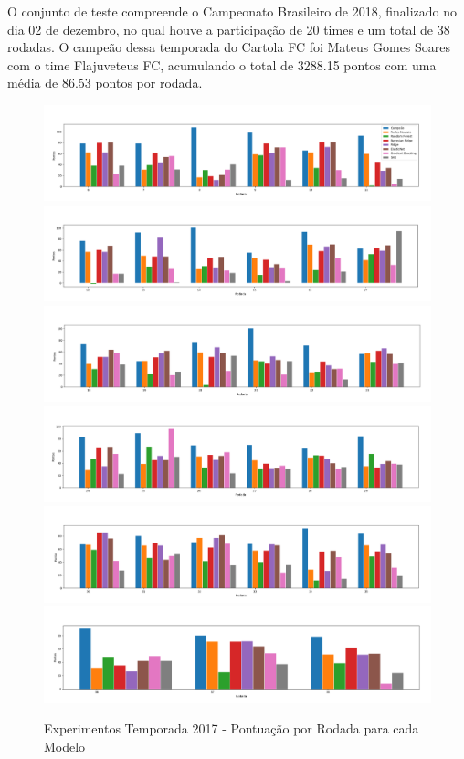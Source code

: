 \documentclass[conference]{IEEEtran}
\begin{document}
O  conjunto  de teste  compreende  o  Campeonato Brasileiro  de  2018,
finalizado no dia 02 de dezembro, no qual houve a participação de 20
times e um total de 38  rodadas. O campeão dessa temporada do Cartola
FC foi  Mateus Gomes Soares  com o  time Flajuveteus FC,  acumulando o
total de 3288.15 pontos com uma média de 86.53 pontos por rodada.

\begin{figure}[H]
  \vspace{-0.5cm}
  \includegraphics[trim={0 1.3cm 0 0}, clip, width=\textwidth]{images/bar_1.png}
  \includegraphics[trim={0 1.3cm 0 0}, clip, width=\textwidth]{images/bar_2.png}
  \includegraphics[trim={0 1.3cm 0 0}, clip, width=\textwidth]{images/bar_3.png}
  \includegraphics[trim={0 1.3cm 0 0}, clip, width=\textwidth]{images/bar_4.png}
  \includegraphics[trim={0 1.3cm 0 0}, clip, width=\textwidth]{images/bar_5.png}
  \includegraphics[width=\textwidth]{images/bar_6.png}
  \caption{Experimentos Temporada 2017 - Pontuação por Rodada para cada Modelo}
  \label{fig:bar_round}
\end{figure}
\end{document}
